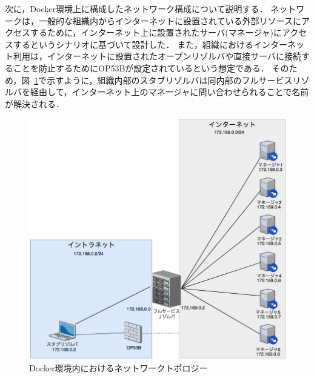 次に，Docker環境上に構成したネットワーク構成について説明する．
ネットワークは，一般的な組織内からインターネットに設置されている外部リソースにアクセスするために，インターネット上に設置されたサーバ(マネージャ)にアクセスするというシナリオに基づいて設計した．
また，組織におけるインターネット利用は，インターネットに設置されたオープンリゾルバや直接サーバに接続することを防止するためにOP53Bが設定されているという想定である．
そのため，図~\ref{fig:exp-network-topology}で示すように，組織内部のスタブリゾルバは同内部のフルサービスリゾルバを経由して，インターネット上のマネージャに問い合わせられることで名前が解決される．

\begin{figure}[htbp]
 \centering
 \includegraphics[scale=0.4]{figure/exp-network-topology.png}
 \caption[実験に用いたネットワークトポロジー]{Docker環境内におけるネットワークトポロジー}
 \label{fig:exp-network-topology}
\end{figure}

\newpage

